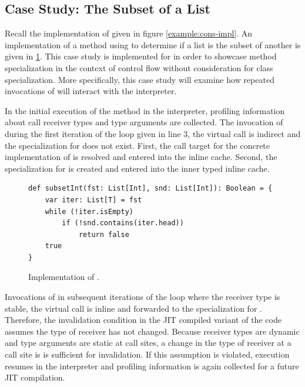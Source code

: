 \subsection{Case Study: The Subset of a List}

Recall the implementation of  given in figure \ref{example:cons-impl}.
An implementation of a method using  to determine if a list is the subset of another is given in \ref{example:list-subset}.
This case study is implemented for  in order to showcase method specialization in the context of control flow without consideration for class specialization.
More specifically, this case study will examine how repeated invocations of  will interact with the interpreter.

In the initial execution of the  method in the interpreter, profiling information about call receiver types and type arguments are collected.
The invocation of  during the first iteration of the loop given in line $3$, the virtual call is indirect and the specialization for  does not exist.
First, the call target for the concrete implementation of  is resolved and entered into the inline cache.
Second, the specialization for  is created and entered into the inner typed inline cache.

\begin{figure}[!htb]
\begin{verbatim}
def subsetInt(fst: List[Int], snd: List[Int]): Boolean = {
	var iter: List[T] = fst
	while (!iter.isEmpty) 
		if (!snd.contains(iter.head))
			return false 
	true
}
\end{verbatim}
\caption{Implementation of .}
\label{example:list-subset}
\end{figure}

Invocations of  in subsequent iterations of the loop where the receiver type is stable, the virtual call is inline and forwarded to the specialization for .
Therefore, the invalidation condition in the JIT compiled variant of the code assumes the type of receiver has not changed.
Because receiver types are dynamic and type arguments are static at call sites, a change in the type of receiver at a call site is is sufficient for invalidation.
If this assumption is violated, execution resumes in the interpreter and profiling information is again collected for a future JIT compilation.

